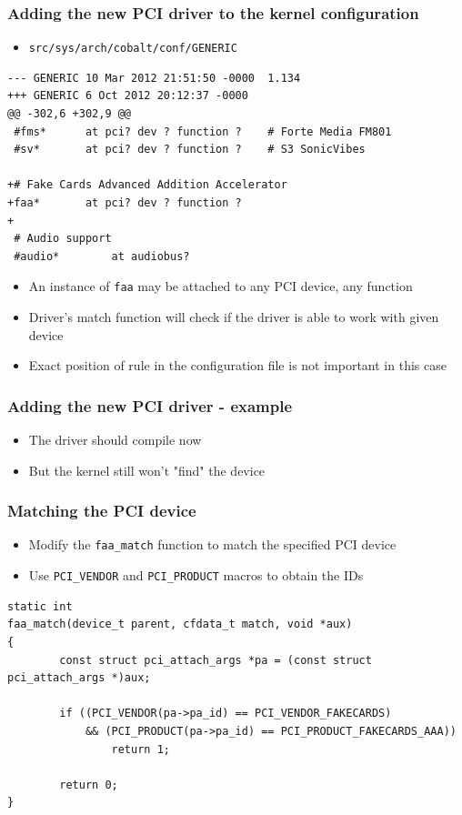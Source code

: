 \documentclass[dvipsnames,table]{beamer}
\begin{document}
\begin{frame}[fragile]
\frametitle{Adding the new PCI driver to the kernel configuration}
\scriptsize
\begin{itemize}
	\item {\tt src/sys/arch/cobalt/conf/GENERIC}
\end{itemize}
\begin{verbatim}
--- GENERIC	10 Mar 2012 21:51:50 -0000	1.134
+++ GENERIC	6 Oct 2012 20:12:37 -0000
@@ -302,6 +302,9 @@
 #fms*		at pci? dev ? function ?	# Forte Media FM801
 #sv*		at pci? dev ? function ?	# S3 SonicVibes
 
+# Fake Cards Advanced Addition Accelerator
+faa*		at pci? dev ? function ?
+
 # Audio support
 #audio*		at audiobus?
\end{verbatim}
\begin{itemize}
	\item An instance of {\tt faa} may be attached to any PCI device, any function
	\item Driver's match function will check if the driver is able to work with given device
	\item Exact position of rule in the configuration file is not important in this case
\end{itemize}
\end{frame}

\begin{frame}
\frametitle{Adding the new PCI driver - example}
\begin{itemize}
	\item The driver should compile now
	\item But the kernel still won't "find" the device
\end{itemize}
\end{frame}

\begin{frame}[fragile]
\frametitle{Matching the PCI device}
\begin{itemize}
	\item Modify the {\tt faa\_match} function to match the specified PCI device
	\item Use {\tt PCI\_VENDOR} and {\tt PCI\_PRODUCT} macros to obtain the IDs
\end{itemize}
\scriptsize
\begin{lstlisting}
static int
faa_match(device_t parent, cfdata_t match, void *aux)
{
        const struct pci_attach_args *pa = (const struct pci_attach_args *)aux;

        if ((PCI_VENDOR(pa->pa_id) == PCI_VENDOR_FAKECARDS) 
            && (PCI_PRODUCT(pa->pa_id) == PCI_PRODUCT_FAKECARDS_AAA))
                return 1;

        return 0;
}
\end{lstlisting}
\end{frame}
\end{document}
